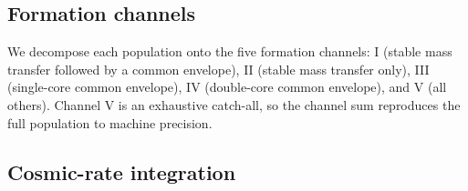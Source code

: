\documentclass[twocolumn,amsmath]{aastex702}
\begin{document}
\subsection{Formation channels} \label{sec:channels}

We decompose each population onto the five \citet{broekgaarden2021} formation
channels: I (stable mass transfer followed by a common envelope), II (stable mass
transfer only), III (single-core common envelope), IV (double-core common
envelope), and V (all others). Channel V is an exhaustive catch-all, so the
channel sum reproduces the full population to machine precision.

\subsection{Cosmic-rate integration} \label{sec:cosmicrate}
\end{document}
